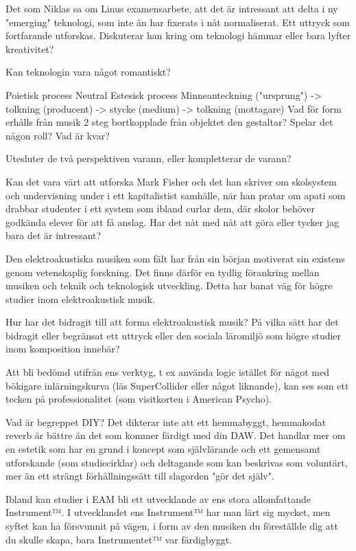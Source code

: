 \documentclass{article}
\begin{document}
Det som Niklas sa om Linus examensarbete, att det är intressant att delta i ny "emerging" teknologi, som inte
än har fixerats i nåt normaliserat. Ett uttryck som fortfarande utforskas. Diskuterar han kring om teknologi
hämmar eller bara lyfter kreativitet? 

Kan teknologin vara något romantiskt? 

Poietisk process		Neutral			   Estesisk process
Minneanteckning ("ursprung") -> tolkning (producent) -> stycke (medium) -> tolkning (mottagare)
	Vad för form erhålls från musik 2 steg bortkopplade från objektet den gestaltar? Spelar det någon roll?
	Vad är kvar? 

Utesluter de två perspektiven varann, eller kompletterar de varann?

Kan det vara värt att utforska Mark Fisher och det han skriver om skolsystem och undervisning under i ett
kapitalistist samhälle, när han pratar om apati som drabbar studenter i ett system som ibland curlar dem, där
skolor behöver godkända elever för att få anslag. Har det nåt med nåt att göra eller tycker jag bara det är
intressant? 

Den elektroakustiska musiken som fält har från sin början motiverat sin existens genom vetenskaplig forskning. 
Det finns därför en tydlig förankring mellan musiken och teknik och teknologisk utveckling. Detta har banat 
väg för högre studier inom elektroakustisk musik.

Hur har det bidragit till att forma elektroakustisk musik? På vilka sätt har det bidragit eller begränsat ett
uttryck eller den sociala läromiljö som högre studier inom komposition innebär? 

Att bli bedömd utifrån ens verktyg, t ex använda logic istället för något med bökigare inlärningskurva (läs
SuperCollider eller något liknande), kan ses som ett tecken på professionalitet (som visitkorten i American
Psycho).

Vad är begreppet DIY? 
Det dikterar inte att ett hemmabyggt, hemmakodat reverb är bättre än det som kommer färdigt med din DAW. Det
handlar mer om en estetik som har en grund i koncept som självlärande och ett gemensamt utforskande (som
studiecirklar) och deltagande som kan beskrivas som voluntärt, mer än ett strängt förhållningssätt till
slagorden "gör det själv".

Ibland kan studier i EAM bli ett utvecklande av ens stora allomfattande Instrument™. I utvecklandet ens
Instrument™ har man lärt sig mycket, men syftet kan ha försvunnit på vägen, i form av den musiken du
föreställde dig att du skulle skapa, bara Instrumentet™ var färdigbyggt.
\end{document}
